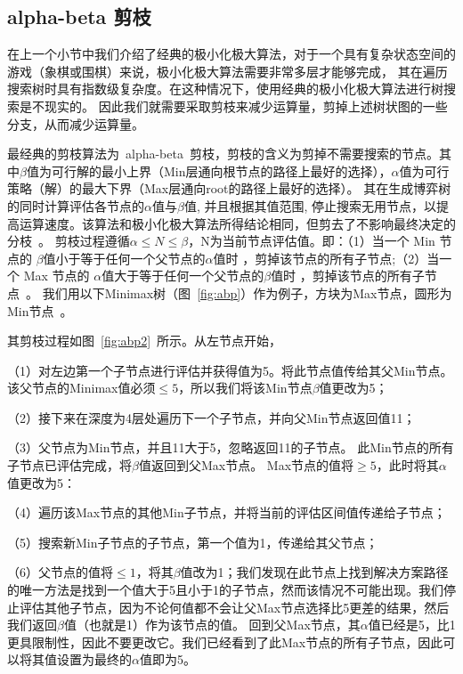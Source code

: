 \subsection{alpha-beta 剪枝}
在上一个小节中我们介绍了经典的极小化极大算法，对于一个具有复杂状态空间的游戏（象棋或围棋）来说，极小化极大算法需要非常多层才能够完成，
其在遍历搜索树时具有指数级复杂度。在这种情况下，使用经典的极小化极大算法进行树搜索是不现实的。
因此我们就需要采取剪枝来减少运算量，剪掉上述树状图的一些分支，从而减少运算量。

最经典的剪枝算法为~alpha-beta~剪枝，剪枝的含义为剪掉不需要搜索的节点。其中$\beta$值为可行解的最小上界（Min层通向根节点的路径上最好的选择），$\alpha$值为可行策略（解）的最大下界（Max层通向root的路径上最好的选择）。
其在生成博弈树的同时计算评估各节点的$\alpha$值与$\beta$值, 并且根据其值范围, 停止搜索无用节点，以提高运算速度。该算法和极小化极大算法所得结论相同，但剪去了不影响最终决定的分枝~\cite{russell2010artificial}。
剪枝过程遵循$\alpha \le N \le \beta$，N为当前节点评估值。即：（1）当一个 Min 节点的 $\beta$值小于等于任何一个父节点的$\alpha$值时 ，剪掉该节点的所有子节点;（2）当一个 Max 节点的 $\alpha$值大于等于任何一个父节点的$\beta$值时 ，剪掉该节点的所有子节点~\cite{russell2010artificial}。
我们用以下Minimax树（图~\ref{fig:abp}）作为例子，方块为Max节点，圆形为Min节点~\cite{russell2010artificial}。

其剪枝过程如图~\ref{fig:abp2}~所示。从左节点开始，

（1）对左边第一个子节点进行评估并获得值为5。将此节点值传给其父Min节点。该父节点的Minimax值必须$\le 5$，所以我们将该Min节点$\beta$值更改为5；

（2）接下来在深度为4层处遍历下一个子节点，并向父Min节点返回值11；

（3）父节点为Min节点，并且11大于5，忽略返回11的子节点。 此Min节点的所有子节点已评估完成，将$\beta$值返回到父Max节点。 Max节点的值将$\ge 5$，此时将其$\alpha$值更改为5：

（4）遍历该Max节点的其他Min子节点，并将当前的评估区间值传递给子节点；

（5）搜索新Min子节点的子节点，第一个值为1，传递给其父节点；

（6）父节点的值将$\le 1$，将其$\beta$值改为1；我们发现在此节点上找到解决方案路径的唯一方法是找到一个值大于5且小于1的子节点，然而该情况不可能出现。我们停止评估其他子节点，因为不论何值都不会让父Max节点选择比5更差的结果，然后我们返回$\beta$值（也就是1）作为该节点的值。
回到父Max节点，其$\alpha$值已经是5，比1更具限制性，因此不要更改它。我们已经看到了此Max节点的所有子节点，因此可以将其值设置为最终的$\alpha$值即为5。

